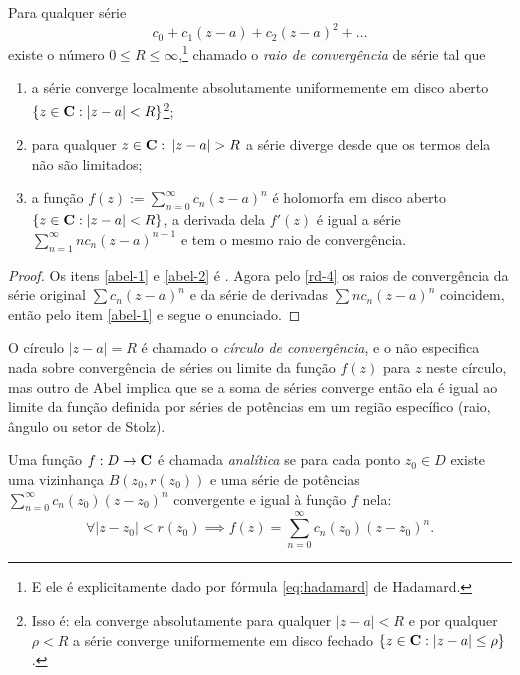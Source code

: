 \begin{teorema}[Abel]
\label{t:abel}
Para qualquer série
\[ c_0 + c_1 (z-a) + c_2 (z-a)^2 + \dots \]
existe o número $0\leq R \leq \infty$,\footnote{
E ele é explicitamente dado por fórmula \eqref{eq:hadamard} de Hadamard.}
chamado o \emph{raio de convergência} de série tal que
\begin{enumerate}
\item \label{abel-1} a série converge localmente absolutamente uniformemente 
em disco aberto $\{z\in \mathbf{C} : |z-a|<R\}$\footnote{Isso é:
ela converge absolutamente para qualquer $|z-a|<R$
e por qualquer $\rho < R$ a série converge uniformemente em disco fechado
$\{z\in\mathbf{C} : |z-a| \leq \rho \}$.};
\item \label{abel-2} para qualquer $z\in\mathbf{C} :\, |z-a| > R$ a série diverge desde que os termos dela não são limitados;
\item \label{abel-3} a função $f(z) := \sum_{n=0}^\infty c_n (z-a)^n$
é holomorfa em disco aberto $\{z\in \mathbf{C} : |z-a| < R\}$,
a derivada dela $f'(z)$ é igual a série $\sum_{n=1}^\infty n c_n (z-a)^{n-1}$
e tem o mesmo raio de convergência.
\end{enumerate}
\end{teorema}
\begin{proof}
Os itens \eqref{abel-1} e \eqref{abel-2} é .
Agora pelo \eqref{rd-4} os raios de convergência
da série original $\sum  c_n (z-a)^n$ e da série de derivadas $\sum n c_n (z-a)^n$ coincidem,
então pelo item \eqref{abel-1} e  segue o enunciado.
\end{proof}

O círculo $|z-a| = R$ é chamado o \emph{círculo de convergência}, e o  não especifica
nada sobre convergência de séries ou limite da função $f(z)$ para $z$ neste círculo,
mas outro  de Abel implica que se a soma de séries converge
então ela é igual ao limite da função definida por séries de potências
em um região específico (raio, ângulo ou setor de Stolz).

\begin{defin}
Uma função $f: D\to \mathbf{C}$ é chamada \emph{analítica}
se para cada ponto $z_0\in D$ existe
uma vizinhança $B(z_0,r(z_0))$
e uma série de potências $\sum_{n=0}^\infty c_n(z_0) (z-z_0)^n$
convergente e igual à função $f$ nela:
\[\forall |z-z_0|<r(z_0) \implies f(z) = \sum_{n=0}^\infty c_n(z_0) (z-z_0)^n .\]
\end{defin}

